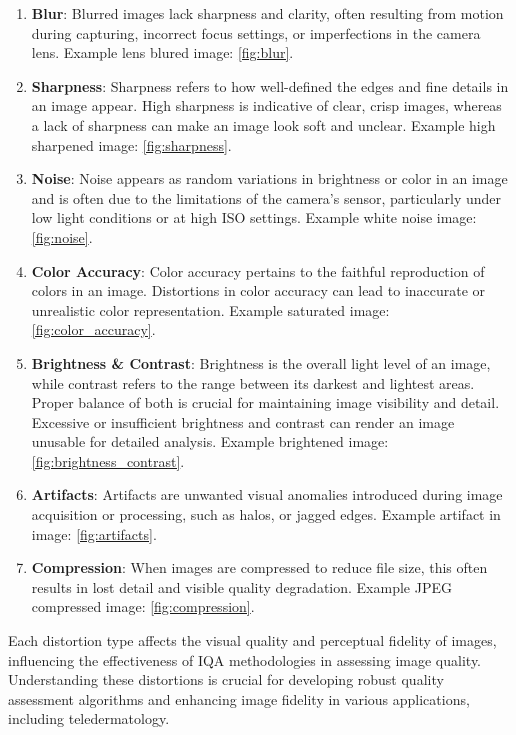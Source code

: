 \begin{enumerate}
    \item \textbf{Blur}: Blurred images lack sharpness and clarity, often resulting from motion during capturing, incorrect focus settings, or imperfections in the camera lens. Example lens blured image: \autoref{fig:blur}.
    \item \textbf{Sharpness}: Sharpness refers to how well-defined the edges and fine details in an image appear. High sharpness is indicative of clear, crisp images, whereas a lack of sharpness can make an image look soft and unclear. Example high sharpened image: \autoref{fig:sharpness}.
    \item \textbf{Noise}: Noise appears as random variations in brightness or color in an image and is often due to the limitations of the camera's sensor, particularly under low light conditions or at high ISO settings. Example white noise image: \autoref{fig:noise}.
    \item \textbf{Color Accuracy}: Color accuracy pertains to the faithful reproduction of colors in an image. Distortions in color accuracy can lead to inaccurate or unrealistic color representation. Example saturated image: \autoref{fig:color_accuracy}.
    \item \textbf{Brightness \& Contrast}: Brightness is the overall light level of an image, while contrast refers to the range between its darkest and lightest areas. Proper balance of both is crucial for maintaining image visibility and detail. Excessive or insufficient brightness and contrast can render an image unusable for detailed analysis. Example brightened image: \autoref{fig:brightness_contrast}.
    \item \textbf{Artifacts}: Artifacts are unwanted visual anomalies introduced during image acquisition or processing, such as halos, or jagged edges. Example artifact in image: \autoref{fig:artifacts}.
    \item \textbf{Compression}: When images are compressed to reduce file size, this often results in lost detail and visible quality degradation. Example JPEG compressed image: \autoref{fig:compression}.
\end{enumerate}
Each distortion type affects the visual quality and perceptual fidelity of images, influencing the effectiveness of IQA methodologies in assessing image quality. Understanding these distortions is crucial for developing robust quality assessment algorithms and enhancing image fidelity in various applications, including teledermatology.

